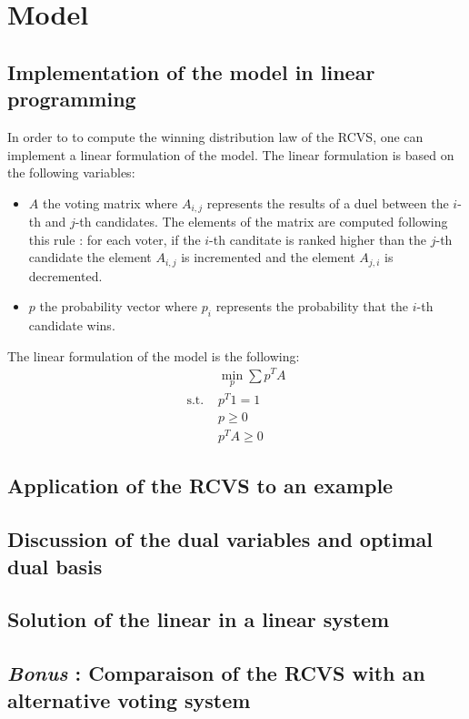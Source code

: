 \section{Model}

\subsection{Implementation of the model in linear programming}
In order to to compute the winning distribution law of the RCVS, one can implement a linear formulation of the model.
The linear formulation is based on the following variables:
\begin{itemize}
  \item $A$ the voting matrix where $A_{i,j}$ represents the results of a duel between the $i$-th and $j$-th candidates.
  The elements of the matrix are computed following this rule : for each voter, if the $i$-th canditate is ranked higher than the $j$-th candidate the element $A_{i,j}$ is incremented
  and the element $A_{j,i}$ is decremented.
  \item $p$ the probability vector where $p_i$ represents the probability that the $i$-th candidate wins.
\end{itemize}

The linear formulation of the model is the following:
\begin{align*}
  &\min_{p} \sum p^T A\\
  \text{s.t. } &p^T 1 = 1\\
  &p \geq 0\\
  &p^T A \geq 0  
\end{align*}

\subsection{Application of the RCVS to an example}


\subsection{Discussion of the dual variables and optimal dual basis}


\subsection{Solution of the linear in a linear system}


\subsection{\textit{Bonus} : Comparaison of the RCVS with an alternative voting system}